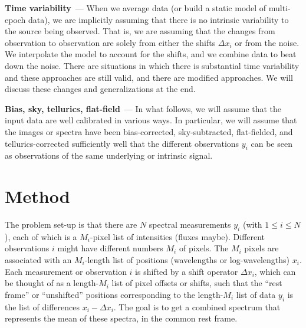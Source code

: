 \documentclass[11pt]{article}
\renewcommand{\paragraph}[1]{\medskip\par\noindent\textbf{#1}~---}
\begin{document}
\paragraph{Time variability}
When we average data (or build a static model of multi-epoch data), we are implicitly assuming that there is no intrinsic variability to the source being observed.
That is, we are assuming that the changes from observation to observation are solely from either the shifts $\Delta x_i$ or from the noise.
We interpolate the model to account for the shifts, and we combine data to beat down the noise.
There are situations in which there is substantial time variability and these approaches are still valid, and there are modified approaches.
We will discuss these changes and generalizations at the end.

\paragraph{Bias, sky, tellurics, flat-field}
In what follows, we will assume that the input data are well calibrated in various ways.
In particular, we will assume that the images or spectra have been bias-corrected, sky-subtracted, flat-fielded, and tellurics-corrected sufficiently well that the different observations $y_i$ can be seen as observations of the same underlying or intrinsic signal.

\section{Method}

The problem set-up is that there are $N$ spectral measurements $y_i$ (with $1\leq i\leq N$), each of which is a $M_i$-pixel list of intensities (fluxes maybe).
Different observations $i$ might have different numbers $M_i$ of pixels.
The $M_i$ pixels are associated with an $M_i$-length list of positions (wavelengths or log-wavelengths) $x_i$.
Each measurement or observation $i$ is shifted by a shift operator $\Delta x_i$, which can be thought of as a length-$M_i$ list of pixel offsets or shifts, such that the ``rest frame'' or ``unshifted'' positions corresponding to the length-$M_i$ list of data $y_i$ is the list of differences $x_i - \Delta x_i$.
The goal is to get a combined spectrum that represents the mean of these spectra, in the common rest frame.
\end{document}
